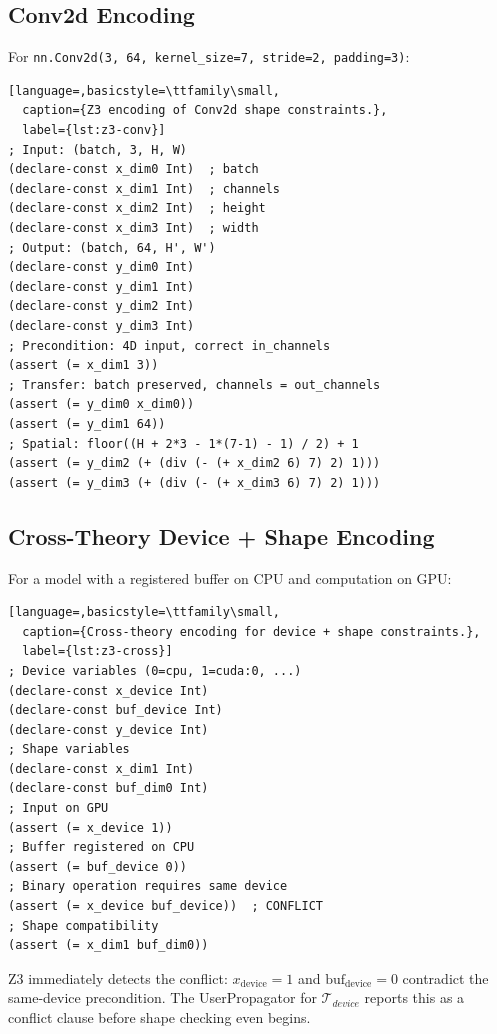 \documentclass[10pt]{article}
\newcommand{\Tdevice}{\mathcal{T}_{\mathit{device}}}
\theoremstyle{plain}
\theoremstyle{definition}
\theoremstyle{remark}
\begin{document}
\subsection{Conv2d Encoding}

For \texttt{nn.Conv2d(3, 64, kernel\_size=7, stride=2, padding=3)}:

\begin{lstlisting}[language=,basicstyle=\ttfamily\small,
  caption={Z3 encoding of Conv2d shape constraints.},
  label={lst:z3-conv}]
; Input: (batch, 3, H, W)
(declare-const x_dim0 Int)  ; batch
(declare-const x_dim1 Int)  ; channels
(declare-const x_dim2 Int)  ; height
(declare-const x_dim3 Int)  ; width
; Output: (batch, 64, H', W')
(declare-const y_dim0 Int)
(declare-const y_dim1 Int)
(declare-const y_dim2 Int)
(declare-const y_dim3 Int)
; Precondition: 4D input, correct in_channels
(assert (= x_dim1 3))
; Transfer: batch preserved, channels = out_channels
(assert (= y_dim0 x_dim0))
(assert (= y_dim1 64))
; Spatial: floor((H + 2*3 - 1*(7-1) - 1) / 2) + 1
(assert (= y_dim2 (+ (div (- (+ x_dim2 6) 7) 2) 1)))
(assert (= y_dim3 (+ (div (- (+ x_dim3 6) 7) 2) 1)))
\end{lstlisting}

\subsection{Cross-Theory Device + Shape Encoding}

For a model with a registered buffer on CPU and computation on GPU:

\begin{lstlisting}[language=,basicstyle=\ttfamily\small,
  caption={Cross-theory encoding for device + shape constraints.},
  label={lst:z3-cross}]
; Device variables (0=cpu, 1=cuda:0, ...)
(declare-const x_device Int)
(declare-const buf_device Int)
(declare-const y_device Int)
; Shape variables
(declare-const x_dim1 Int)
(declare-const buf_dim0 Int)
; Input on GPU
(assert (= x_device 1))
; Buffer registered on CPU
(assert (= buf_device 0))
; Binary operation requires same device
(assert (= x_device buf_device))  ; CONFLICT
; Shape compatibility
(assert (= x_dim1 buf_dim0))
\end{lstlisting}

\noindent
Z3 immediately detects the conflict: $x_\text{device} = 1$ and
$\text{buf}_\text{device} = 0$ contradict the same-device precondition.
The UserPropagator for $\Tdevice$ reports this as a conflict clause
before shape checking even begins.
\end{document}
